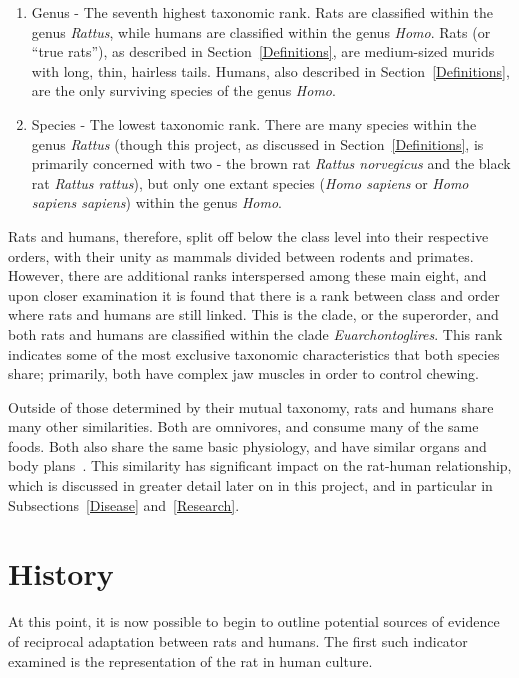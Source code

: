 \documentclass[12pt]{article}
\begin{document}
\begin{enumerate}
\item Genus - The seventh highest taxonomic rank. Rats are classified within the genus \textit{Rattus}, while humans are classified within the genus \textit{Homo}. Rats (or ``true rats''), as described in Section~\ref{Definitions}, are medium-sized murids with long, thin, hairless tails. Humans, also described in Section~\ref{Definitions}, are the only surviving species of the genus \textit{Homo}.
\item Species - The lowest taxonomic rank. There are many species within the genus \textit{Rattus} (though this project, as discussed in Section~\ref{Definitions}, is primarily concerned with two - the brown rat \textit{Rattus norvegicus} and the black rat \textit{Rattus rattus}), but only one extant species (\textit{Homo sapiens} or \textit{Homo sapiens sapiens}) within the genus \textit{Homo}.
\end{enumerate}
Rats and humans, therefore, split off below the class level into their respective orders, with their unity as mammals divided between rodents and primates. However, there are additional ranks interspersed among these main eight, and upon closer examination it is found that there is a rank between class and order where rats and humans are still linked. This is the clade, or the superorder, and both rats and humans are classified within the clade \textit{Euarchontoglires}. This rank indicates some of the most exclusive taxonomic characteristics that both species share; primarily, both have complex jaw muscles in order to control chewing.

Outside of those determined by their mutual taxonomy, rats and humans share many other similarities. Both are omnivores, and consume many of the same foods. Both also share the same basic physiology, and have similar organs and body plans~\cite{Spencer2012}. This similarity has significant impact on the rat-human relationship, which is discussed in greater detail later on in this project, and in particular in Subsections~\ref{Disease} and~\ref{Research}.

\section{History} \label{History}

At this point, it is now possible to begin to outline potential sources of evidence of reciprocal adaptation between rats and humans. The first such indicator examined is the representation of the rat in human culture.
\end{document}
